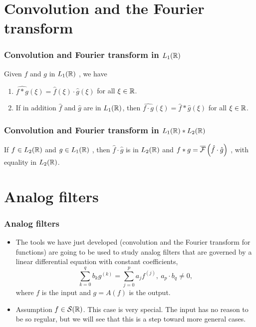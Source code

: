\section{Convolution and the Fourier transform}
\begin{frame}
\frametitle{Convolution and Fourier transform in $L_1(\mathbb{R})$}
\begin{theorem}
Given $f$ and $g$ in $L_1(\mathbb{R})$ , we have
\begin{enumerate}[label=(\roman*)]
\item $\widehat{f*g}(\xi)=\hat{f}(\xi)\cdot\hat{g}(\xi)$  for all $\xi \in \mathbb{R}$.
\item If in addition $\hat{f}$ and $\hat{g}$ are in $L_1(\mathbb{R})$, then
$\widehat{f\cdot g}(\xi)=\hat{f}*\hat{g}(\xi)$ for all $\xi\in \mathbb{R}$.
\end{enumerate}
\end{theorem}

\end{frame}



\begin{frame}
\frametitle{Convolution and Fourier transform in $L_1(\mathbb{R}) * L_2(\mathbb{R})$}
\begin{theorem}
If $ f\in L_2(\mathbb{R})$ and $g\in L_1(\mathbb{R})$ , then $\hat{f}\cdot\hat{g}$  is in $L_2(\mathbb{R})$  and $f*g=\overline{\mathcal{F}}\left( \hat{f}\cdot\hat{g} \right)$ , with  equality in $L_2(\mathbb{R})$.
\end{theorem}
\end{frame}

\section{Analog filters}
\begin{frame}
\frametitle{Analog filters}
\begin{itemize}
\item The tools we have just developed (convolution and the Fourier transform for functions) are going to be used to study analog filters that are governed by a linear differential equation with constant coefficients,
$$
\sum_{k=0}^{q}b_{k}g^{(k)}=\sum_{j=0}^{p}a_{j}f^{(j)},\ a_{p}\cdot b_{q}\neq 0,
$$
where $f$ is the input and $g=A(f)$ is the output.
\item  \alert{Assumption}  $f \in \mathcal{S}(\mathbb{R})$. This case is very special. The input has no reason to be so regular, but we will see that this is a step toward more general cases.
\end{itemize}
\end{frame}

